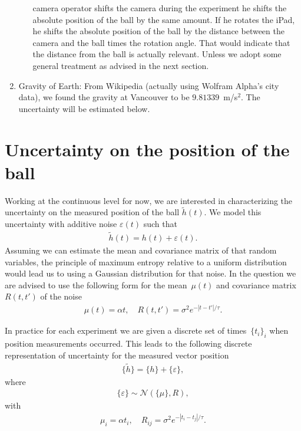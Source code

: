 \documentclass{article}
\begin{document}
\begin{enumerate}
\begin{itemize}
       camera operator shifts the camera during the experiment he shifts
       the absolute position of the ball by the same amount. If he
       rotates the iPad, he shifts the absolute position of the ball by
       the distance between the camera and the ball times the rotation
       angle. That would indicate that the distance from the ball is
       actually relevant. Unless we adopt some general treatment as
       advised in the next section. 
\end{itemize}
 \item Gravity of Earth: From Wikipedia (actually using Wolfram Alpha's
       city data), we found the gravity at Vancouver to be
       $9.81339$~m/s$^2$. The uncertainty will be estimated below. 
\end{enumerate}

\section{Uncertainty on the position of the ball}

Working at the continuous level for now, we are interested in
characterizing the uncertainty on the measured position of the ball
$\tilde{h}(t)$.  
We model this uncertainty with additive noise $\varepsilon(t)$ such that 
\begin{align*}
 \tilde{h}(t) = h(t) + \varepsilon(t).
\end{align*}
Assuming we can estimate the mean and covariance matrix of that random
variables, the principle of maximum entropy relative to a uniform
distribution would lead us to using a Gaussian distribution for that
noise. 
In the question we are advised to use the following form for the
mean~$\mu(t)$ and covariance matrix~$R(t,t')$ of the noise 
\begin{align*}
 \mu(t) = \alpha t , \quad R(t,t') = \sigma^2 e^{-|t-t'|/\tau} .
\end{align*}

In practice for each experiment we are given a discrete set of times~$\{
t_i \}_i$ when position measurements occurred. This leads to the
following discrete representation of uncertainty for the measured vector
position 
\begin{align*}
 \{ \tilde{h} \} = \{ h \} + \{ \varepsilon \},
\end{align*}
where
\begin{align*}
 \{ \varepsilon \} \sim \mathcal{N}\left( \{ \mu \} ,  R  \right),
\end{align*}
with
\begin{align*}
 \mu_i = \alpha t_i, \quad R_{ij} = \sigma^2 e^{-|t_i-t_j|/\tau}.
\end{align*}
\end{document}
